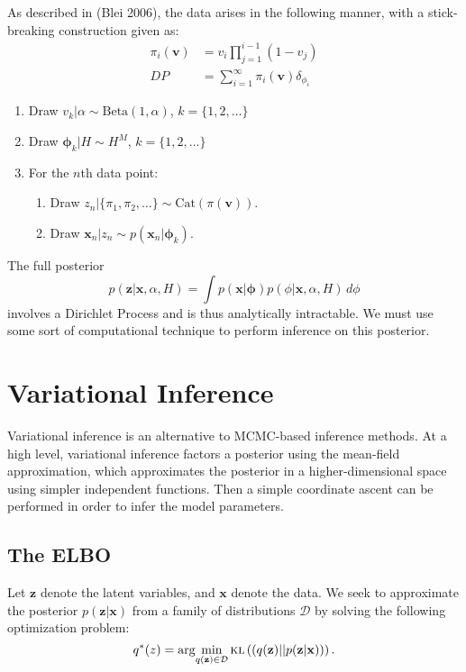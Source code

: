 \documentclass[11pt]{article}
\newcommand{\bx}{\ensuremath{\mathbf{x}}}
\newcommand{\bz}{\ensuremath{\mathbf{z}}}
\newcommand{\bphi}{\ensuremath{\bm{\phi}}}
\newcommand{\kl}[1]{\textsc{kl}\left(#1\right)}
\begin{document}
As described in (Blei 2006), the data arises in the following manner, with a stick-breaking construction given as:
\begin{align*}
\pi_i(\mathbf{v}) &= v_i \prod\limits_{j=1}^{i-1} (1 - v_j) \\
				DP &= \sum_{i=1}^\infty \pi_i(\mathbf{v}) \delta_{\phi_i}
\end{align*}
\begin{enumerate}
	\item Draw $v_k | \alpha \sim \mathrm{Beta}(1, \alpha)$, \hspace{0.2cm} $k = \{1, 2, \ldots\}$
	\item Draw $\bphi_k | H \sim H^M$, \hspace{1cm} $k = \{1, 2, \ldots\}$
	\item For the $n$th data point:
	\begin{enumerate}
		\item Draw $z_n | \{\pi_1, \pi_2, \ldots\} \sim \mathrm{Cat}(\pi(\mathbf{v}))$.
		\item Draw $\bx_n | z_n \sim p(\bx_n | \bphi_k)$.
	\end{enumerate}
\end{enumerate}
The full posterior 
\begin{equation}
p(\bz | \bx, \alpha, H) = \int p(\bx | \mathbf{\phi}) p(\phi | \bx, \alpha, H) \, d\phi
\end{equation}
involves a Dirichlet Process and is thus analytically intractable. We must use some sort of computational technique to perform inference on this posterior.

\section{Variational Inference}

Variational inference is an alternative to MCMC-based inference methods. At a high level, variational inference factors a posterior using the mean-field approximation, which approximates the posterior in a higher-dimensional space using simpler independent functions. Then a simple coordinate ascent can be performed in order to infer the model parameters.

\subsection{The \textsc{ELBO}}

Let $\mathbf{z}$ denote the latent variables, and $\mathbf{x}$ denote the data. We seek to approximate the posterior $p(\mathbf{z}|\mathbf{x})$ from a family of distributions $\mathcal{D}$ by solving the following optimization problem: 
\begin{equation}
q^*(z) = \arg\!\min_{q(\mathbf{z}) \in \mathcal{D}} \kl{(q(\mathbf{z}) || p(\mathbf{z}|\mathbf{x}))}.
\end{equation}
\end{document}
